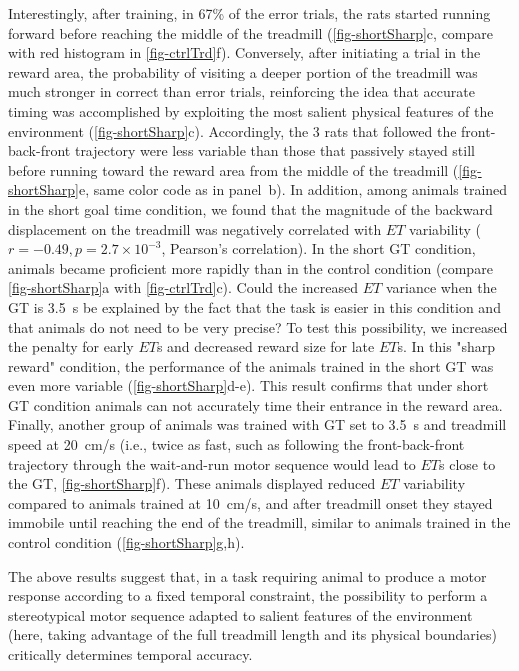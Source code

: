 Interestingly, after training, in 67\% of the error trials, the rats started running forward before reaching the middle of the treadmill (\autoref{fig-shortSharp}c, compare with red histogram in \autoref{fig-ctrlTrd}f).
Conversely, after initiating a trial in the reward area, the probability of visiting a deeper portion of the treadmill was much stronger in correct than error trials, reinforcing the idea that accurate timing was accomplished by exploiting the most salient physical features of the environment (\autoref{fig-shortSharp}c).
Accordingly, the 3 rats that followed the front-back-front trajectory were less variable than those that passively stayed still before running toward the reward area from the middle of the treadmill (\autoref{fig-shortSharp}e, same color code as in panel~b).
In addition, among animals trained in the short goal time condition, we found that the magnitude of the backward displacement on the treadmill was negatively correlated with $ET$ variability ($r=-0.49, p=2.7\times 10^{-3}$, Pearson's correlation).
In the short GT condition, animals became proficient more rapidly than in the control condition (compare \autoref{fig-shortSharp}a with \autoref{fig-ctrlTrd}c).
Could the increased $ET$ variance when the GT is 3.5~s be explained by the fact that the task is easier in this condition and that animals do not need to be very precise?
To test this possibility, we increased the penalty for early $ET$s and decreased reward size for late $ET$s.
In this "sharp reward" condition, the performance of the animals trained in the short GT was even more variable (\autoref{fig-shortSharp}d-e).
This result confirms that under short GT condition animals can not accurately time their entrance in the reward area.
Finally, another group of animals was trained with GT set to 3.5~s and treadmill speed at 20~cm/s (i.e., twice as fast, such as following the front-back-front trajectory through the wait-and-run motor sequence would lead to $ET$s close to the GT, \autoref{fig-shortSharp}f).
These animals displayed reduced $ET$ variability compared to animals trained at 10~cm/s, and after treadmill onset they stayed immobile until reaching the end of the treadmill, similar to animals trained in the control condition (\autoref{fig-shortSharp}g,h).
\par

The above results suggest that, in a task requiring animal to produce a motor response according to a fixed temporal constraint, the possibility to perform a stereotypical motor sequence adapted to salient features of the environment (here, taking advantage of the full treadmill length and its physical boundaries) critically determines temporal accuracy.
